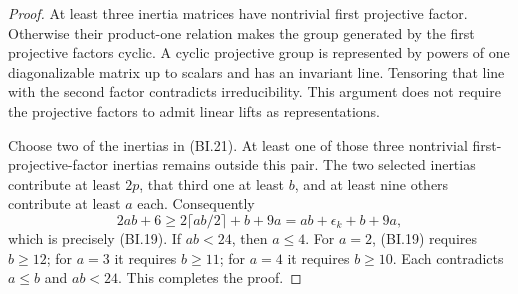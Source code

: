 \begin{proof}
At least three inertia matrices have nontrivial first projective
factor.  Otherwise their product-one relation makes the group
generated by the first projective factors cyclic.  A cyclic projective
group is represented by powers of one diagonalizable matrix up to
scalars and has an invariant line.  Tensoring that line with the
second factor contradicts irreducibility.  This argument does not
require the projective factors to admit linear lifts as representations.

Choose two of the inertias in (BI.21).  At least one of those three
nontrivial first-projective-factor inertias remains outside this pair.
The two selected inertias contribute at least $2p$, that third one
at least $b$, and at least nine others contribute at least $a$ each.
Consequently
\[
 2ab+6\ge 2\lceil ab/2\rceil+b+9a
                 =ab+\epsilon_k+b+9a,
\]
which is precisely (BI.19).  If $ab<24$, then $a\le4$.
For $a=2$, (BI.19) requires $b\ge12$; for $a=3$ it requires
$b\ge11$; for $a=4$ it requires $b\ge10$.  Each contradicts
$a\le b$ and $ab<24$.  This completes the proof.
\end{proof}

